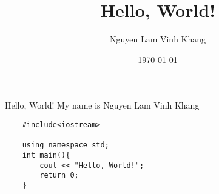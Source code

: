\documentclass{article}
\title{Hello, World!}
\author{Nguyen Lam Vinh Khang}
\date{\today}
\begin{document}
Hello, World!
My name is Nguyen Lam Vinh Khang
\begin{verbatim}
    #include<iostream>

    using namespace std;
    int main(){
        cout << "Hello, World!";
        return 0;
    }
\end{verbatim}
\end{document}
